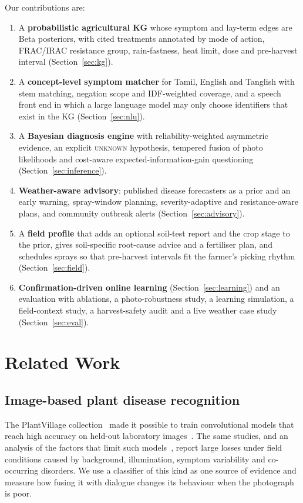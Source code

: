 \documentclass[conference]{IEEEtran}
\newcommand{\unk}{\textsc{unknown}}
\begin{document}
Our contributions are:
\begin{enumerate}
  \item A \textbf{probabilistic agricultural KG} whose symptom and lay-term edges are Beta posteriors, with cited treatments annotated by mode of action, FRAC/IRAC resistance group, rain-fastness, heat limit, dose and pre-harvest interval (Section~\ref{sec:kg}).
  \item A \textbf{concept-level symptom matcher} for Tamil, English and Tanglish with stem matching, negation scope and IDF-weighted coverage, and a speech front end in which a large language model may only choose identifiers that exist in the KG (Section~\ref{sec:nlu}).
  \item A \textbf{Bayesian diagnosis engine} with reliability-weighted asymmetric evidence, an explicit \unk{} hypothesis, tempered fusion of photo likelihoods and cost-aware expected-information-gain questioning (Section~\ref{sec:inference}).
  \item \textbf{Weather-aware advisory}: published disease forecasters as a prior and an early warning, spray-window planning, severity-adaptive and resistance-aware plans, and community outbreak alerts (Section~\ref{sec:advisory}).
  \item A \textbf{field profile} that adds an optional soil-test report and the crop stage to the prior, gives soil-specific root-cause advice and a fertiliser plan, and schedules sprays so that pre-harvest intervals fit the farmer's picking rhythm (Section~\ref{sec:field}).
  \item \textbf{Confirmation-driven online learning} (Section~\ref{sec:learning}) and an evaluation with ablations, a photo-robustness study, a learning simulation, a field-context study, a harvest-safety audit and a live weather case study (Section~\ref{sec:eval}).
\end{enumerate}

\section{Related Work}

\subsection{Image-based plant disease recognition}
The PlantVillage collection~\cite{hughes2015} made it possible to train convolutional models that reach high accuracy on held-out laboratory images~\cite{mohanty2016,ferentinos2018}. The same studies, and an analysis of the factors that limit such models~\cite{barbedo2018}, report large losses under field conditions caused by background, illumination, symptom variability and co-occurring disorders. We use a classifier of this kind as one source of evidence and measure how fusing it with dialogue changes its behaviour when the photograph is poor.
\end{document}
